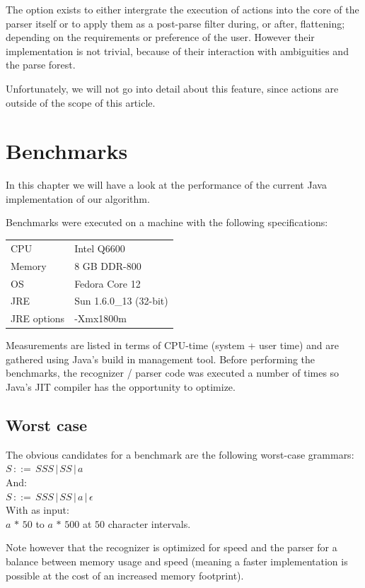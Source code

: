 \documentclass[a4paper,10pt]{article}
\begin{document}
The option exists to either intergrate the execution of actions into the core of the parser itself or to apply them as a post-parse filter during, or after, flattening; depending on the requirements or preference of the user. However their implementation is not trivial, because of their interaction with ambiguities and the parse forest.

Unfortunately, we will not go into detail about this feature, since actions are outside of the scope of this article.

\section{Benchmarks}

In this chapter we will have a look at the performance of the current Java implementation of our algorithm.

Benchmarks were executed on a machine with the following specifications:
\begin{table}[H]
\centering
\begin{tabular}{ | p{6em} | p{9em} | }
 \hline
 CPU & Intel Q6600 \\
 Memory & 8 GB DDR-800 \\
 OS & Fedora Core 12 \\
 JRE & Sun 1.6.0\_13 (32-bit) \\
 JRE options & -Xmx1800m \\
 \hline
\end{tabular}
\end{table}

Measurements are listed in terms of CPU-time (system + user time) and are gathered using Java's build in management tool. Before performing the benchmarks, the recognizer / parser code was executed a number of times so Java's JIT compiler has the opportunity to optimize.

\subsection{Worst case}

The obvious candidates for a benchmark are the following worst-case grammars:
$S\,::=\,SSS\,|\,SS\,|\,a$\\
And:\\
$S\,::=\,SSS\,|\,SS\,|\,a\,|\,\epsilon$\\
With as input:\\
$a\,*\,50$ to $a\,*\,500$ at $50$ character intervals.

Note however that the recognizer is optimized for speed and the parser for a balance between memory usage and speed (meaning a faster implementation is possible at the cost of an increased memory footprint).
\end{document}
